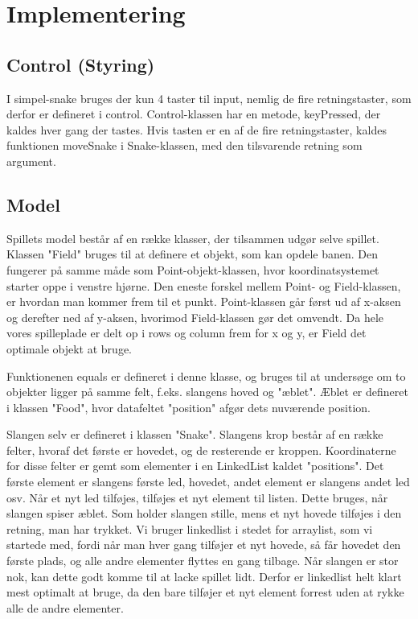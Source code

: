 \documentclass{report}
\begin{document}
\section{Implementering}


\subsection{Control (Styring)}
I simpel-snake bruges der kun 4 taster til input, nemlig de fire retningstaster, som derfor er defineret i control. Control-klassen har en metode, keyPressed, der kaldes hver gang der tastes. Hvis tasten er en af de fire retningstaster, kaldes funktionen moveSnake i Snake-klassen, med den tilsvarende retning som argument.

\subsection{Model}
Spillets model består af en række klasser, der tilsammen udgør selve spillet.
Klassen "Field" bruges til at definere et objekt, som kan opdele banen. Den fungerer på samme måde som Point-objekt-klassen, hvor koordinatsystemet starter oppe i venstre hjørne. Den eneste forskel mellem Point- og Field-klassen, er hvordan man kommer frem til et punkt. Point-klassen går først ud af x-aksen og derefter ned af y-aksen, hvorimod Field-klassen gør det omvendt. Da hele vores spilleplade er delt op i rows og column frem for x og y, er Field det optimale objekt at bruge.
\linebreak

Funktionenen equals er defineret i denne klasse, og bruges til at undersøge om to objekter ligger på samme felt, f.eks. slangens hoved og "æblet". Æblet er defineret i klassen "Food", hvor datafeltet "position" afgør dets nuværende position. 

Slangen selv er defineret i klassen "Snake". Slangens krop består af en række felter, hvoraf det første er hovedet, og de resterende er kroppen. Koordinaterne for disse felter er gemt som elementer i en LinkedList kaldet "positions". Det første element er slangens første led, hovedet, andet element er slangens andet led osv. Når et nyt led tilføjes, tilføjes et nyt element til listen. Dette bruges, når slangen spiser æblet. Som holder slangen stille, mens et nyt hovede tilføjes i den retning, man har trykket. 
Vi bruger linkedlist i stedet for arraylist, som vi startede med, fordi når man hver gang tilføjer et nyt hovede, så får hovedet den første plads, og alle andre elementer flyttes en gang tilbage. Når slangen er stor nok, kan dette godt komme til at lacke spillet lidt. Derfor er linkedlist helt klart mest optimalt at bruge, da den bare tilføjer et nyt element forrest uden at rykke alle de andre elementer.
\end{document}
